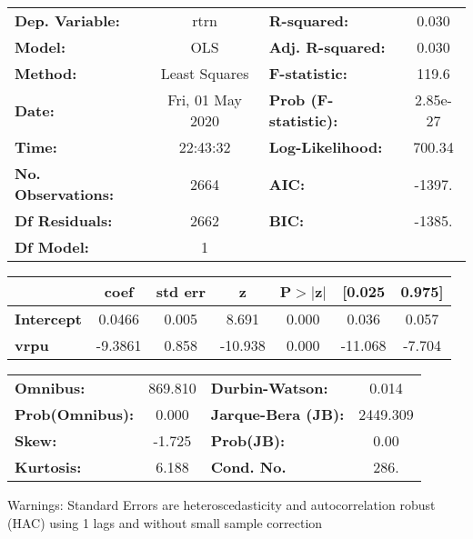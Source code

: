 \begin{center}
\begin{tabular}{lclc}
\toprule
\textbf{Dep. Variable:}    &       rtrn       & \textbf{  R-squared:         } &     0.030   \\
\textbf{Model:}            &       OLS        & \textbf{  Adj. R-squared:    } &     0.030   \\
\textbf{Method:}           &  Least Squares   & \textbf{  F-statistic:       } &     119.6   \\
\textbf{Date:}             & Fri, 01 May 2020 & \textbf{  Prob (F-statistic):} &  2.85e-27   \\
\textbf{Time:}             &     22:43:32     & \textbf{  Log-Likelihood:    } &    700.34   \\
\textbf{No. Observations:} &        2664      & \textbf{  AIC:               } &    -1397.   \\
\textbf{Df Residuals:}     &        2662      & \textbf{  BIC:               } &    -1385.   \\
\textbf{Df Model:}         &           1      & \textbf{                     } &             \\
\bottomrule
\end{tabular}
\begin{tabular}{lcccccc}
                   & \textbf{coef} & \textbf{std err} & \textbf{z} & \textbf{P$> |$z$|$} & \textbf{[0.025} & \textbf{0.975]}  \\
\midrule
\textbf{Intercept} &       0.0466  &        0.005     &     8.691  &         0.000        &        0.036    &        0.057     \\
\textbf{vrpu}      &      -9.3861  &        0.858     &   -10.938  &         0.000        &      -11.068    &       -7.704     \\
\bottomrule
\end{tabular}
\begin{tabular}{lclc}
\textbf{Omnibus:}       & 869.810 & \textbf{  Durbin-Watson:     } &    0.014  \\
\textbf{Prob(Omnibus):} &   0.000 & \textbf{  Jarque-Bera (JB):  } & 2449.309  \\
\textbf{Skew:}          &  -1.725 & \textbf{  Prob(JB):          } &     0.00  \\
\textbf{Kurtosis:}      &   6.188 & \textbf{  Cond. No.          } &     286.  \\
\bottomrule
\end{tabular}
\end{center}

Warnings: \newline
 [1] Standard Errors are heteroscedasticity and autocorrelation robust (HAC) using 1 lags and without small sample correction